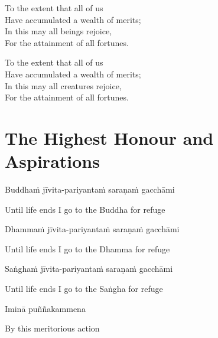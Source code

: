 \begin{cprenglish}
  To the extent that all of us\\
  Have accumulated a wealth of merits;\\
  In this may all beings rejoice,\\
  For the attainment of all fortunes.
\end{cprenglish}

\begin{cprenglish}
  To the extent that all of us\\
  Have accumulated a wealth of merits;\\
  In this may all creatures rejoice,\\
  For the attainment of all fortunes.
\end{cprenglish}


\clearpage

\section{The Highest Honour and Aspirations}
\label{highest-honour-aspirations}

\begin{leader}
\end{leader}

Buddhaṁ jīvita-pariyantaṁ saraṇaṁ gacchāmi

\begin{cprenglish}
  Until life ends I go to the Buddha for refuge
\end{cprenglish}

Dhammaṁ jīvita-pariyantaṁ saraṇaṁ gacchāmi

\begin{cprenglish}
  Until life ends I go to the Dhamma for refuge
\end{cprenglish}

Saṅghaṁ jīvita-pariyantaṁ saraṇaṁ gacchāmi

\begin{cprenglish}
  Until life ends I go to the Saṅgha for refuge
\end{cprenglish}

Iminā puññakammena

\begin{cprenglish}
  By this meritorious action
\end{cprenglish}


